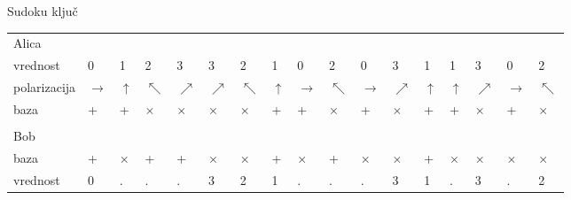 \documentclass{beamer}
\begin{document}
\begin{frame}{Sudoku ključ}
\begin{tabular}{m{1.5cm} m{0.10 cm} m{0.10 cm} m{0.10 cm} m{0.10 cm} m{0.10 cm} m{0.10 cm} m{0.10 cm} m{0.10 cm} m{0.10 cm} m{0.10 cm} m{0.10 cm} m{0.10 cm} m{0.10 cm} m{0.10 cm} m{0.10 cm} m{0.10 cm}}
Alica\\
vrednost & 0 & 1 & 2 & 3 & 3 & 2 & 1 & 0 & 2 & 0 & 3 & 1 & 1 & 3 & 0 & 2\\
polarizacija & $\rightarrow$ & $\uparrow$ & $\nwarrow$ & $\nearrow$ & $\nearrow$ & $\nwarrow$ & $\uparrow$ & $\rightarrow$ & $\nwarrow$ & $\rightarrow$ & $\nearrow$ & $\uparrow$ & $\uparrow$ & $\nearrow$ & $\rightarrow$ & $\nwarrow$\\
baza & + & + & $\times$ & $\times$ & $\times$ & $\times$ & + & + & $\times$ & + & $\times$ & + & + & $\times$ & + & $\times$\\
\\
Bob\\
baza & + & $\times$ & + & + & $\times$ & $\times$ & + & $\times$ & + & $\times$ & $\times$ & + & $\times$ & $\times$ & $\times$ & $\times$\\
vrednost & 0 & . & . & . & 3 & 2 & 1 & . & . & . & 3 & 1 & . & 3 & . & 2\\ 
\end{tabular}

\end{frame}

\end{document}
